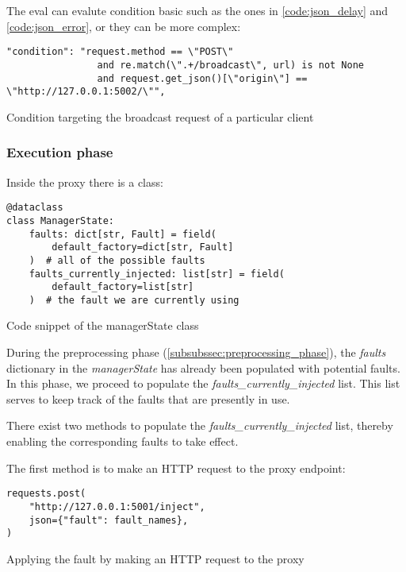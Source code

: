 The eval can evalute condition basic such as the ones in \ref{code:json_delay} and
\ref{code:json_error}, or they can be more complex:

\begin{listing}[H]
  \begin{verbatim}
"condition": "request.method == \"POST\" 
                and re.match(\".+/broadcast\", url) is not None  
                and request.get_json()[\"origin\"] == \"http://127.0.0.1:5002/\"",
  \end{verbatim}
  \caption{Condition targeting the broadcast request of a particular client}
\end{listing}

\subsubsection{Execution phase}

Inside the proxy there is a class: 
\begin{listing}[!ht]
  \begin{verbatim}
@dataclass
class ManagerState:
    faults: dict[str, Fault] = field(
        default_factory=dict[str, Fault]
    )  # all of the possible faults
    faults_currently_injected: list[str] = field(
        default_factory=list[str]
    )  # the fault we are currently using
  \end{verbatim}
  \caption{Code snippet of the managerState class}
  \label{code:managerState}
\end{listing}

During the preprocessing phase (\ref{subsubssec:preprocessing_phase}), the 
\textit{faults} dictionary in the \textit{managerState} has already been populated 
with potential faults. In this phase, we proceed to populate the \textit{faults\_currently\_injected} 
list. This list serves to keep track of the faults that are presently in use.

There exist two methods to populate the \textit{faults\_currently\_injected} list, thereby enabling the corresponding faults to take effect.

The first method is to make an HTTP request to the proxy endpoint: 

\begin{listing}[H]
  \begin{verbatim}
requests.post(
    "http://127.0.0.1:5001/inject",
    json={"fault": fault_names},
)
  \end{verbatim}
  \caption{Applying the fault by making an HTTP request to the proxy}
\end{listing}

